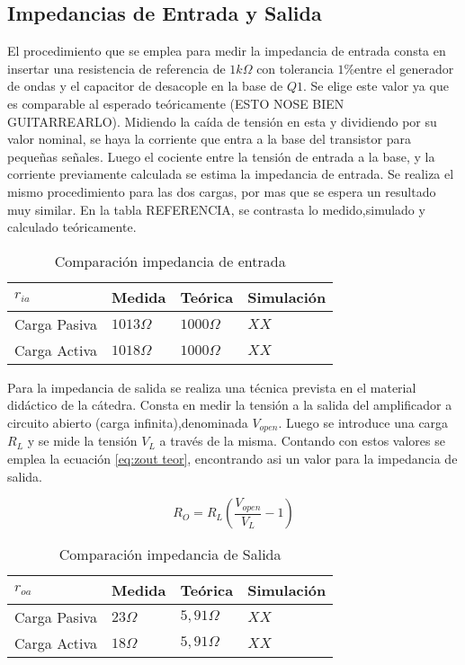 \subsection{Impedancias de Entrada y Salida}

El procedimiento que se emplea para medir la impedancia de entrada consta en insertar una resistencia de referencia de $1 k\Omega$ con tolerancia $1\%$entre el generador de ondas y el capacitor de desacople en la base de $Q1$. Se elige este valor ya que es comparable al esperado teóricamente (ESTO NOSE BIEN GUITARREARLO).
Midiendo la caída de tensión en esta y dividiendo por su valor nominal, se haya la corriente que entra a la base del transistor para pequeñas señales. Luego el cociente entre la tensión de entrada a la base, y la corriente previamente calculada se estima la impedancia de entrada.
Se realiza el mismo procedimiento para las dos cargas, por mas que se espera un resultado muy similar. En la tabla REFERENCIA, se contrasta lo medido,simulado y calculado teóricamente.

\begin{table}[ht]
    \centering
    \begin{tabular}{|l|l|l|l|}
    \hline
    $r_{ia}$     & Medida       & Teórica         & Simulación \\ \hline
    Carga Pasiva & $1013\Omega$ & $1000\Omega $   &  $XX $          \\ \hline
    Carga Activa & $1018\Omega$ & $1000\Omega $  &  $XX $          \\ \hline
    \end{tabular}
    \caption{Comparación impedancia de entrada}\label{table:Ri comp}
\end{table}

Para la impedancia de salida se realiza una técnica prevista en el material didáctico de la cátedra. Consta en medir la tensión a la salida del amplificador a circuito abierto (carga infinita),denominada $V_{open}$. Luego se introduce una carga $R_L$ y se mide la tensión $V_L$ a través de la misma.
Contando con estos valores se emplea la ecuación \ref{eq:zout teor}, encontrando asi un valor para la impedancia de salida.

\begin{equation}
    R_O = R_L(\frac{V_{open}}{V_L}-1)
    \label{eq:zout teor}
\end{equation}

\begin{table}[ht]
    \centering
    \begin{tabular}{|l|l|l|l|}
    \hline
    $r_{oa}$     & Medida     & Teórica         & Simulación \\ \hline
    Carga Pasiva & $23\Omega$ & $5,91\Omega $   &  $XX $          \\ \hline
    Carga Activa & $18\Omega$ &  $5,91\Omega $  &  $XX $          \\ \hline
    \end{tabular}
    \caption{Comparación impedancia de Salida}\label{table:Ro comp}
\end{table}

